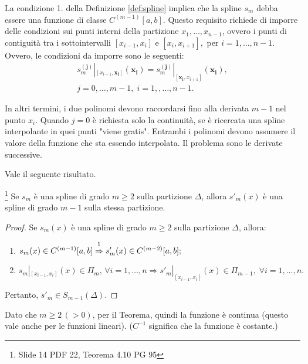 La condizione 1. della Definizione \ref{def:spline} implica che la spline $s_m$ debba essere una funzione di classe $C^{(m-1)}[a,b]$. Questo requisito richiede di imporre delle condizioni sui punti interni della partizione $x_1,\hdots,x_{n-1}$, ovvero i punti di contiguità tra i sottointervalli $[x_{i-1},x_i]$ e $[x_i,x_{i+1}],$ per $ i=1,\hdots,n-1$. Ovvero, le condizioni da imporre sono le seguenti:
\begin{equation}\label{eq:condInterpSpline2}
    \begin{matrix}
        s_m^{(\boldsymbol{j})}|_{[x_{i-1},\boldsymbol{x_i}]}(\boldsymbol{x_i})= s_m^{(\boldsymbol{j})}|_{[\boldsymbol{x_i},x_{i+1}]}(\boldsymbol{x_i}),\\
        j=0,\hdots,m-1,\; i=1,,\hdots,n-1.
    \end{matrix}
\end{equation}

\noindent\footnotemark In altri termini, i due polinomi devono raccordarsi fino alla derivata $m-1$ nel punto $x_i$. Quando $j=0$ è richiesta solo la continuità, se è ricercata una spline interpolante in quei punti "viene gratis". Entrambi i polinomi devono assumere il valore della funzione che sta essendo interpolata. Il problema sono le derivate successive.

Vale il seguente risultato.

\begin{theorem}\label{th:gradoDervSpline}
    \footnote{Slide 14 PDF 22, Teorema 4.10 PG 95} Se $s_m$ è una spline di grado $m\geq 2$ sulla partizione $\Delta$, allora $s'_m(x)$ è una spline di grado $m-1$ sulla stessa partizione.
\end{theorem}
\begin{proof}
    Se $s_m(x)$ è una spline di grado $m\geq 2$ sulla partizione $\Delta$, allora:
    \begin{enumerate}
        \item $s_m(x)\in C^{(m-1)}[a,b]\overset{\footnotemark}{\Rightarrow} s'_m(x)\in C^{(m-2)}[a,b];$
        \item $s_m|_{[x_{i-1},x_i]}(x)\in\Pi_m,\,\forall i=1,\hdots,n\Rightarrow s'_m|_{[x_{i-1},x_i]}(x)\in\Pi_{m-1},\;\forall i=1,\hdots,n.$
    \end{enumerate}
    Pertanto, $s'_m\in S_{m-1}(\Delta).$
\end{proof}
Dato che $m\geq 2\,(>0)$, per il Teorema, quindi la funzione è continua (questo vale anche per le funzioni lineari). ($C^{-1}$ significa che la funzione è costante.)

